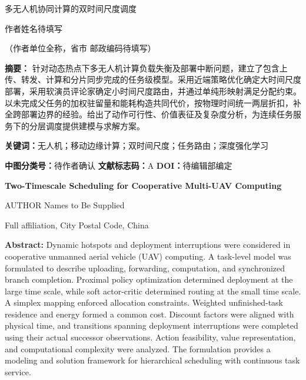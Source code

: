 \thispagestyle{empty}
\begin{center}
{\heiti\fontsize{18}{23}\selectfont 多无人机协同计算的双时间尺度调度\par}
\vspace{8mm}
{\fontsize{12}{17}\selectfont 作者姓名待填写\par}
\vspace{3mm}
{\fontsize{10.5}{15}\selectfont （作者单位全称，省市 邮政编码待填写）\par}
\end{center}
\vspace{5mm}
\noindent\textbf{摘\quad 要：}
针对动态热点下多无人机计算负载失衡及部署中断问题，建立了包含上传、转发、计算和分片同步完成的任务级模型。采用近端策略优化确定大时间尺度部署，采用软演员评论家确定小时间尺度路由，并通过单纯形映射满足分配约束。以未完成父任务的加权驻留量和能耗构造共同代价，按物理时间统一两层折扣，补全跨部署边界的经验。给出了动作可行性、价值表征及复杂度分析，为连续任务服务下的分层调度提供建模与求解方案。

\vspace{3mm}
\noindent\textbf{关键词：}无人机；移动边缘计算；双时间尺度；任务路由；深度强化学习

\vspace{3mm}
\noindent\textbf{中图分类号：}待作者确认\qquad
\textbf{文献标志码：}A\qquad
\textbf{DOI：}待编辑部编定

\vspace{10mm}
\begin{center}
{\bfseries\fontsize{15}{20}\selectfont Two-Timescale Scheduling for Cooperative Multi-UAV Computing\par}
\vspace{4mm}
{\fontsize{11}{16}\selectfont AUTHOR Names to Be Supplied\par}
\vspace{2mm}
{\fontsize{10}{14}\selectfont Full affiliation, City Postal Code, China\par}
\end{center}
\vspace{4mm}
\noindent\textbf{Abstract:}
Dynamic hotspots and deployment interruptions were considered in cooperative unmanned aerial vehicle (UAV) computing. A task-level model was formulated to describe uploading, forwarding, computation, and synchronized branch completion. Proximal policy optimization determined deployment at the large time scale, while soft actor-critic determined routing at the small time scale. A simplex mapping enforced allocation constraints. Weighted unfinished-task residence and energy formed a common cost. Discount factors were aligned with physical time, and transitions spanning deployment interruptions were completed using their actual successor observations. Action feasibility, value representation, and computational complexity were analyzed. The formulation provides a modeling and solution framework for hierarchical scheduling with continuous task service.

